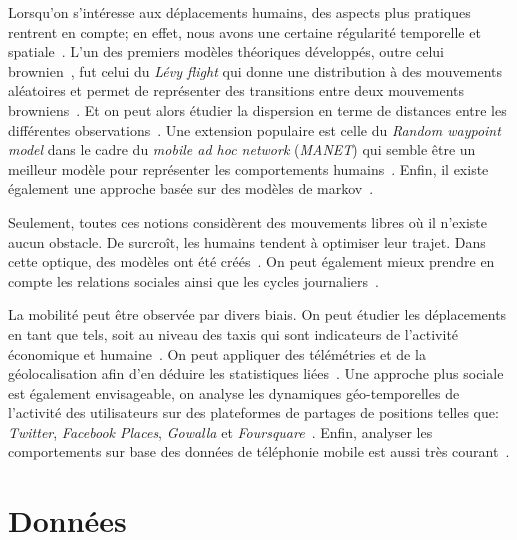 
Lorsqu'on s'intéresse aux déplacements humains, des aspects plus pratiques rentrent en compte; en effet, nous avons une certaine régularité temporelle et spatiale~\cite{gonzalez2008understanding}. L'un des premiers modèles théoriques développés, outre celui brownien~\cite{einstein1905movement}, fut celui du \textit{Lévy flight} qui donne une distribution à des mouvements aléatoires et permet de représenter des transitions entre deux mouvements browniens~\cite{rhee2011levy, sims2008scaling}. Et on peut alors étudier la dispersion en terme de distances entre les différentes observations~\cite{brockmann2006scaling}. Une extension populaire est celle du \textit{Random waypoint model} dans le cadre du \textit{mobile ad hoc network} (\textit{MANET}) qui semble être un meilleur modèle pour représenter les comportements humains~\cite{camp2002survey}. Enfin, il existe également une approche basée sur des modèles de markov~\cite{bettstetter2001mobility}.

Seulement, toutes ces notions considèrent des mouvements libres où il n'existe aucun obstacle. De surcroît, les humains tendent à optimiser leur trajet. Dans cette optique, des modèles ont été créés~\cite{lee2009slaw}. On peut également mieux prendre en compte les relations sociales ainsi que les cycles journaliers~\cite{cho2011friendship}.

La mobilité peut être observée par divers biais. On peut étudier les déplacements en tant que tels, soit au niveau des taxis qui sont indicateurs de l'activité économique et humaine~\cite{ferreira2013visual}. On peut appliquer des télémétries et de la géolocalisation afin d'en déduire les statistiques liées~\cite{uppoor2014generation}. Une approche plus sociale est également envisageable, on analyse les dynamiques géo-temporelles de l'activité des utilisateurs sur des plateformes de partages de positions telles que: \textit{Twitter}, \textit{Facebook Places}, \textit{Gowalla} et \textit{Foursquare}~\cite{noulas2011empirical, noulas2012tale, hasan2013understanding, cheng2011exploring}. Enfin, analyser les comportements sur base des données de téléphonie mobile est aussi très courant~\cite{becker2013human, de2013unique, ahas2010daily, deville2014dynamic}.

\section{Données}

